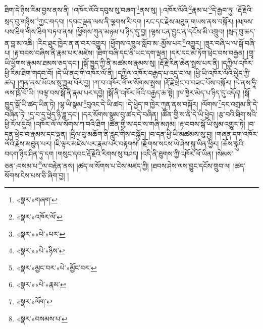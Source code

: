 ཐིག་དེ་ཉིས་རིམ་བྱས་ནས་ནི། །འཁོར་ལོའི་དབུས་སུ་བཞག་\footnote{«སྣར་»གཞག་}ནས་སུ། །:འཁོར་ལོའི་\footnote{«སྣར་»འཁོར་ལོ་}རྣམ་པ་\footnote{«སྣར་»«པེ་»པར་}དེ་རྒྱབ་ཏུ། །རྡོ་རྗེའི་སྲད་བུ་གཉིས་\footnote{«སྣར་»«པེ་»ཉིས་}ཀྱང་གདབ། །དབང་ལྡན་ལས་ནི་ལྕགས་རི་དག །རང་དང་རྗེས་མཐུན་གཡས་ནས་བསྐོར། །མཁས་པས་ཐིག་གིས་ཐིག་བཏབ་ནས། །ཕྱོགས་ཀུན་མཉམ་པ་ཉིད་དུ་བྱ། །ལྟས་ངན་བྱུང་ན་དངོས་མི་འགྲུབ། །སྲད་བུ་ཆད་ན་བླ་མ་འཆི། །རིང་ཐུང་ཁྱེར་ན་ན་བར་འགྱུར། །ཕྱོགས་འཁྲུལ་སློབ་མ་:མྱོས་པར་\footnote{«སྣར་»མྱང་བར་«པེ་»མྱོང་བར་}འགྱུར། །ཟུར་བཞི་པ་ལ་སྒོ་བཞི་པ། །རྟ་བབས་བཞིས་ནི་རྣམ་པར་མཛེས། །ཐིག་བཞི་དང་ནི་ཡང་དག་ལྡན། །དར་དང་མེ་ཏོག་ཕྲེང་བས་བརྒྱན། །གྲྭ་ཡི་ཕྱོགས་རྣམས་ཐམས་ཅད་དང་། །སྒོ་ཁྱུད་ཀྱི་ནི་མཚམས་རྣམས་སུ། །རྡོ་རྗེ་རིན་ཆེན་སྤྲས་པར་ནི། །དཀྱིལ་འཁོར་ཕྱི་རིམ་ཐིག་གདབ་བོ། །དེ་ཡི་ནང་གི་འཁོར་ལོ་ནི། །དཀྱིལ་འཁོར་བརྒྱད་པ་འདྲ་བ་ལ། །ཕྱི་ཡི་འཁོར་ལོའི་ཕྱེད་ཀྱི་ཚད། །ཀུན་ནས་ཡོངས་སུ་ཟླུམ་པོར་བྱ། །ཀ་བ་འཁོར་ལོ་ལ་སོགས་སྤྲས། །རྡོ་རྗེ་ཕྲེང་བ་བཟང་པོས་བསྐོར། །དེ་ནས་ཧཱི་ལས་ཁྲོ་བོ་ཡི། །བལྟ་བས་སྒོ་ནི་རྣམ་པར་དབྱེ། །སྒོ་ནི་འཁོར་ལོའི་བརྒྱད་ཆ་སྟེ། །ཁ་ཁྱེར་མེད་པ་ཉིད་དུ་འདོད། །སྒོ་ཁྱུད་སྒོ་ཡི་ཚད་ཡིན་ཏེ། །ལྷ་ཡི་སྣམ་\footnote{«སྣར་»«པེ་»རྣམ་}བུའང་དེ་ཡི་ཚད། །དེ་ཕྱེད་ཁ་ཁྱེར་ཀུན་ནས་བསྐོར། །ལོགས་\footnote{«སྣར་»ལོག་}དང་འགྲམ་ནི་དེ་བཞིན་ཏེ། །དྲ་བ་དྲ་ཕྱེད་ཉི་ཟླ་དང་། །དར་སོགས་སྣམ་བུ་ཚད་དེ་བཞིན། །ཚོན་གྱི་ས་ནི་དེ་ཡི་ཕྱེད། །རྩ་བའི་ཐིག་སའི་ཕྱི་རོལ་དུའོ། །འཁོར་ལོ་ལ་སོགས་ཀ་བའི་ཐིག །ཚོན་གྱི་ས་དང་ས་གཞི་མཉམ། །རྟ་བབས་སྒོ་ཡི་སུམ་འགྱུར་ཏེ། །བ་དན་ཕྲེང་བ་རྣམས་དང་ལྡན། །དྲིལ་བུ་མཆོག་ནི་རླུང་གིས་བསྐྱོད། །བ་དན་ཕྱི་ཡི་མཚམས་སུ་བྱ། །གཞན་དག་འཁོར་ལོའི་རྗེས་མཐུན་པར། །ཇི་ལྟར་མཛེས་པར་རྣམ་པར་བརྟགས། །རྫོགས་སངས་ཡེ་ཤེས་སྐུ་ཡིན་ཕྱིར། །ཆོས་སྐུའི་བདག་ཉིད་ཤིན་ཏུ་དག །གསུང་དབང་རྡོ་རྗེའི་རིགས་སུ་བཤད། །འདི་ནི་ཐུགས་ཀྱི་འཁོར་ལོ་ཡིན། །སེམས་ཅན་:བསམ་པ་\footnote{«སྣར་»བསམས་པ་}ལ་བརྟེན་ནས། །ཚད་ལ་སོགས་པ་ངེས་མཛད་ཀྱི། །ཐབས་ཤེས་ལས་བྱུང་དངོས་གྲུབ་ལ། །ཚད་སོགས་ངེས་པས་ཅི་ཞིག་བྱ། །

